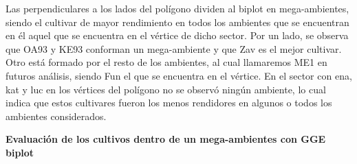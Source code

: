Las perpendiculares a los lados del polígono dividen al biplot en mega-ambientes, siendo el cultivar de mayor rendimiento en todos los ambientes que se encuentran en él aquel que se encuentra en el vértice de dicho sector. Por un lado, se observa que OA93 y KE93 conforman un mega-ambiente y que Zav es el mejor cultivar. Otro está formado por el resto de los ambientes, al cual llamaremos ME1 en futuros análisis, siendo Fun el que se encuentra en el vértice. En el sector con ena, kat y luc en los vértices del polígono no se observó ningún ambiente, lo cual indica que estos cultivares fueron los menos rendidores en algunos o todos los ambientes considerados.


\textbf{Evaluación de los cultivos dentro de un mega-ambientes con GGE biplot}

